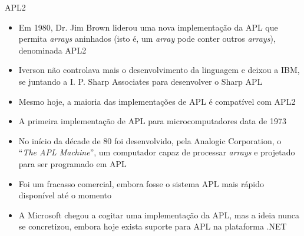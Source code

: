 \begin{frame}[fragile]{APL2}

    \begin{itemize}
        \item Em 1980, Dr. Jim Brown liderou uma nova implementação da APL que permita \textit{arrays} aninhados (isto é, um \textit{array} pode conter outros \textit{arrays}), denominada APL2

        \pause
        \item Iverson não controlava mais o desenvolvimento da linguagem e deixou a IBM, se juntando a I. P. Sharp Associates para desenvolver o Sharp APL
        \pause

        \item Mesmo hoje, a maioria das implementações de APL é compatível com APL2
        \pause

        \item A primeira implementação de APL para microcomputadores data de 1973
        \pause

        \item No início da décade de 80 foi desenvolvido, pela Analogic Corporation, o ``\textit{The APL Machine}'', um computador capaz de processar \textit{arrays} e projetado para ser programado em APL
        \pause

        \item  Foi um fracasso comercial, embora fosse o sistema APL mais rápido disponível até o momento
        \pause
        \item A Microsoft chegou a cogitar uma implementação da APL, mas a ideia nunca se concretizou, embora hoje exista suporte para APL na plataforma .NET
    \end{itemize}

\end{frame}

